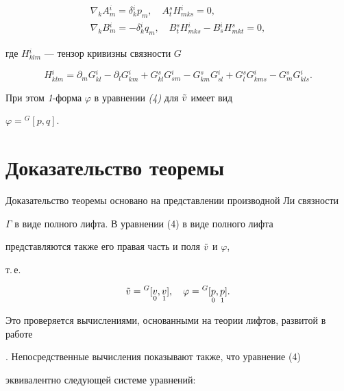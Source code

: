 \begin{thmnonum}
\begin{gather*}
\nabla_kA{}^i_m=\delta{}^i_kp_m,\quad 


A{}^s_tH{}^i_{mks}=0,\\ 


\nabla_kB{}^i_m=-\delta{}^i_kq_m,\quad 


B{}^s_tH{}^i_{mks}-B{}^i_sH{}^s_{mkt}=0, 


\end{gather*} 


где $H{}^i_{klm}$ --- тензор кривизны связности $G$ {\em \cite{Ru}} 


$$ 


H{}^i_{klm}=\partial_mG{}^i_{kl} 


-\partial_lG{}^i_{km}+G{}^s_{kl}G{}^i_{sm}- 


G{}^s_{km}G{}^i_{sl}+G{}^s_lG{}^i_{kms}- 


G{}^s_mG{}^i_{kls}. 


$$ 


При этом {\em 1}-форма $\varphi$ в уравнении {\em (4)} для $\Tilde v$ имеет вид


$\varphi={}^G[p,q]$. 


\end{thmnonum} 


 


\section{Доказательство теоремы} 


 


Доказательство теоремы основано на представлении производной Ли связности 


$\Gamma$ в виде полного лифта. В уравнении (4) в виде полного лифта 


представляются также его правая часть и поля $\Tilde v$ и $\varphi$, 


т.\,е. 


$$ 


\Tilde v={}^G[\down{0}{v},\down{1}{v}],\quad 


\varphi={}^G[\down{0}{p},\down{1}{p}]. 


$$ 


Это проверяется вычислениями, основанными на теории лифтов, развитой в работе 


\cite{Kag1}. Непосредственные вычисления показывают также, что уравнение (4)


эквивалентно следующей системе уравнений: 


